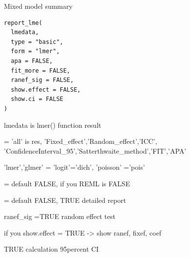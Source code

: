 \documentclass[a4paper]{book}
\begin{document}
%
\begin{Description}
Mixed model summary
\end{Description}
%
\begin{Usage}
\begin{verbatim}
report_lme(
  lmedata,
  type = "basic",
  form = "lmer",
  apa = FALSE,
  fit_more = FALSE,
  ranef_sig = FALSE,
  show.effect = FALSE,
  show.ci = FALSE
)
\end{verbatim}
\end{Usage}
%
\begin{Arguments}
\begin{ldescription}
\item[\code{lmedata}] lmedata is lmer() function result

\item[\code{type}] = 'all' is res, 'Fixed\_effect','Random\_effect','ICC', 'ConfidenceInterval\_95','Satterthwaite\_method','FIT','APA'

\item[\code{form}] 'lmer','glmer' = 'logit'='dich', 'poisson' ='pois'

\item[\code{apa}] = default FALSE, if you  REML is FALSE

\item[\code{fit\_more}] = default FALSE, TRUE detailed report

\item[\code{ranef\_sig}] ranef\_sig =TRUE  random effect test

\item[\code{show.effect}] if you show.effect = TRUE -> show ranef, fixef, coef

\item[\code{show.ci}] TRUE calculation 95percent CI
\end{ldescription}
\end{Arguments}
%
\end{document}
